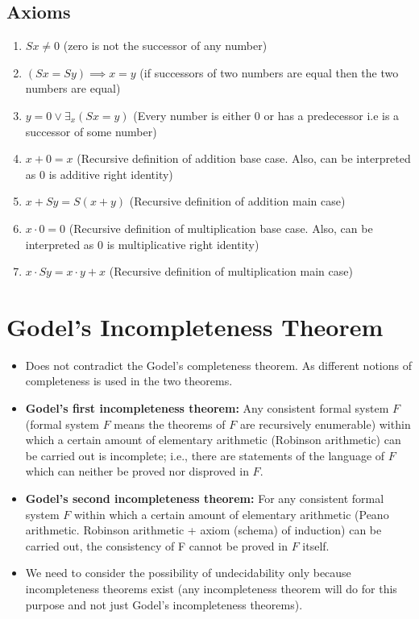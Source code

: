 \documentclass[
11pt,notheorems,hyperref={pdfauthor=whatever}
]{beamer}
\begin{document}
\subsection{Axioms}
\begin{frame}
    \begin{enumerate}
        \setlength\itemsep{2em}
        \item $Sx \not= 0$ (zero is not the successor of any number)
        \item $(Sx = Sy) \implies x = y$ (if successors of two numbers are equal then the two numbers are equal)
        \item $y = 0 \vee \exists_x (Sx = y)$ (Every number is either 0 or has a predecessor i.e is a successor of some number)
        \item $x + 0 = x$ (Recursive definition of addition base case. Also, can be interpreted as $0$ is additive right identity)
        \item $x + Sy = S(x+y)$ (Recursive definition of addition main case)
        \item $x \cdot 0 = 0$ (Recursive definition of multiplication base case. Also, can be interpreted as $0$ is multiplicative right identity)
        \item $x \cdot Sy = x \cdot y + x$ (Recursive definition of multiplication main case)
    \end{enumerate}
\end{frame}

\section{Godel's Incompleteness Theorem}
\begin{frame}
\begin{itemize}
    \setlength\itemsep{1em}
    \item Does not contradict the Godel's completeness theorem. As different notions of completeness is used in the two theorems.
    \item \textbf{Godel's first incompleteness theorem: } Any consistent formal system $F$ (formal system $F$ means the theorems of $F$ are recursively enumerable) within which a certain amount of elementary arithmetic (Robinson arithmetic) can be carried out is incomplete; i.e., there are statements of the language of $F$ which can neither be proved nor disproved in $F$. \cite{raatikainen2013godel}
    \item \textbf{Godel's second incompleteness theorem: } For any consistent formal system $F$ within which a certain amount of elementary arithmetic (Peano arithmetic. Robinson arithmetic + axiom (schema) of induction) can be carried out, the consistency of F cannot be proved in $F$ itself. \cite{raatikainen2013godel}
    \item We need to consider the possibility of undecidability only because incompleteness theorems exist (any incompleteness theorem will do for this purpose and not just Godel's incompleteness theorems).
\end{itemize}
\end{frame}
\end{document}
